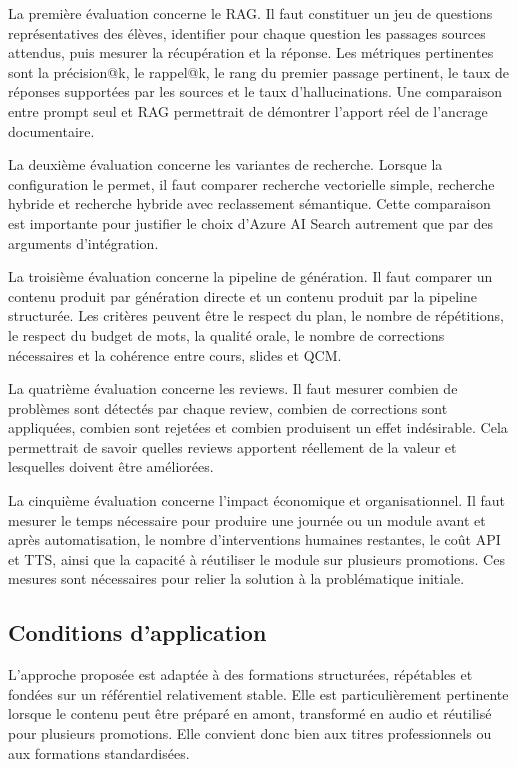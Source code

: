\documentclass[12pt,a4paper]{article}
\begin{document}
La première évaluation concerne le RAG. Il faut constituer un jeu de questions
représentatives des élèves, identifier pour chaque question les passages sources attendus,
puis mesurer la récupération et la réponse. Les métriques pertinentes sont la précision@k,
le rappel@k, le rang du premier passage pertinent, le taux de réponses supportées par les
sources et le taux d'hallucinations. Une comparaison entre prompt seul et RAG permettrait
de démontrer l'apport réel de l'ancrage documentaire.

La deuxième évaluation concerne les variantes de recherche. Lorsque la configuration le
permet, il faut comparer recherche vectorielle simple, recherche hybride et recherche
hybride avec reclassement sémantique. Cette comparaison est importante pour justifier
le choix d'Azure AI Search autrement que par des arguments d'intégration.

La troisième évaluation concerne la pipeline de génération. Il faut comparer un contenu
produit par génération directe et un contenu produit par la pipeline structurée. Les critères
peuvent être le respect du plan, le nombre de répétitions, le respect du budget de mots,
la qualité orale, le nombre de corrections nécessaires et la cohérence entre cours, slides
et QCM.

La quatrième évaluation concerne les reviews. Il faut mesurer combien de problèmes sont
détectés par chaque review, combien de corrections sont appliquées, combien sont
rejetées et combien produisent un effet indésirable. Cela permettrait de savoir quelles
reviews apportent réellement de la valeur et lesquelles doivent être améliorées.

La cinquième évaluation concerne l'impact économique et organisationnel. Il faut mesurer
le temps nécessaire pour produire une journée ou un module avant et après automatisation,
le nombre d'interventions humaines restantes, le coût API et TTS, ainsi que la capacité à
réutiliser le module sur plusieurs promotions. Ces mesures sont nécessaires pour relier la
solution à la problématique initiale.

\subsection{Conditions d'application}

L'approche proposée est adaptée à des formations structurées, répétables et fondées sur
un référentiel relativement stable. Elle est particulièrement pertinente lorsque le contenu
peut être préparé en amont, transformé en audio et réutilisé pour plusieurs promotions.
Elle convient donc bien aux titres professionnels ou aux formations standardisées.
\end{document}
